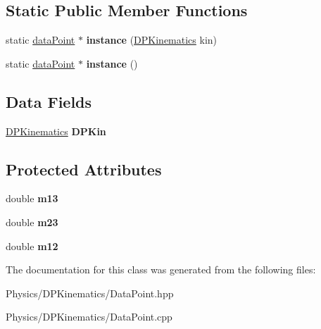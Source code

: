\subsection*{Static Public Member Functions}
\begin{DoxyCompactItemize}
\item 
\hypertarget{classdata_point_acee721adf94bc7e7ff83888ef0e5740c}{static \hyperlink{classdata_point}{data\-Point} $\ast$ {\bfseries instance} (\hyperlink{class_d_p_kinematics}{D\-P\-Kinematics} kin)}\label{classdata_point_acee721adf94bc7e7ff83888ef0e5740c}

\item 
\hypertarget{classdata_point_a908a2c03b60c833a983f2bf5b95b967c}{static \hyperlink{classdata_point}{data\-Point} $\ast$ {\bfseries instance} ()}\label{classdata_point_a908a2c03b60c833a983f2bf5b95b967c}

\end{DoxyCompactItemize}
\subsection*{Data Fields}
\begin{DoxyCompactItemize}
\item 
\hypertarget{classdata_point_a2cdd1e1b4e82b904de9f159b52bdb40a}{\hyperlink{class_d_p_kinematics}{D\-P\-Kinematics} {\bfseries D\-P\-Kin}}\label{classdata_point_a2cdd1e1b4e82b904de9f159b52bdb40a}

\end{DoxyCompactItemize}
\subsection*{Protected Attributes}
\begin{DoxyCompactItemize}
\item 
\hypertarget{classdata_point_a5ed8b2f81ecf006ca70c51406be27502}{double {\bfseries m13}}\label{classdata_point_a5ed8b2f81ecf006ca70c51406be27502}

\item 
\hypertarget{classdata_point_a805c2f1b6ffbf6e0657a6a85b5c9217a}{double {\bfseries m23}}\label{classdata_point_a805c2f1b6ffbf6e0657a6a85b5c9217a}

\item 
\hypertarget{classdata_point_aecc86799f3754aecfb1b0f10f14f61bd}{double {\bfseries m12}}\label{classdata_point_aecc86799f3754aecfb1b0f10f14f61bd}

\end{DoxyCompactItemize}


The documentation for this class was generated from the following files\-:\begin{DoxyCompactItemize}
\item 
Physics/\-D\-P\-Kinematics/Data\-Point.\-hpp\item 
Physics/\-D\-P\-Kinematics/Data\-Point.\-cpp\end{DoxyCompactItemize}
